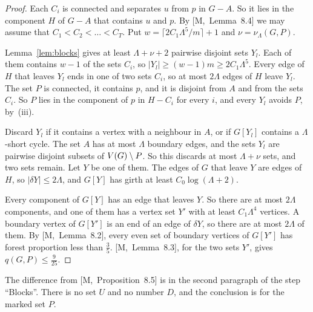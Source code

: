 \documentclass[11pt]{article}
\newcommand{\M}[1]{[M,~#1]}
\begin{document}
\begin{proof}
Each $C_i$ is connected and separates $u$ from $p$ in $G-A$. So it lies in the component $H$ of
$G-A$ that contains $u$ and $p$. By \M{Lemma~8.4} we may assume that $C_1<C_2<\dots<C_T$. Put
$w=\lceil2C_1\Lambda^{5}/m\rceil+1$ and $\nu=\nu_\Lambda(G,P)$.

 Lemma~\ref{lem:blocks} gives at least $\Lambda+\nu+2$ pairwise disjoint sets
$Y_l$. Each of them contains $w-1$ of the sets $C_i$, so $|Y_l|\ge(w-1)m\ge2C_1\Lambda^{5}$. Every
edge of $H$ that leaves $Y_l$ ends in one of two sets $C_i$, so at most $2\Lambda$ edges of $H$
leave $Y_l$. The set $P$ is connected, it contains $p$, and it is disjoint from $A$ and from the
sets $C_i$. So $P$ lies in the component of $p$ in $H-C_i$ for every $i$, and every $Y_l$ avoids
$P$, by~(iii).

Discard $Y_l$ if it contains a vertex with a neighbour in $A$, or if $G[Y_l]$ contains a
$\Lambda$-short cycle. The set $A$ has at most $\Lambda$ boundary edges, and the sets $Y_l$ are
pairwise disjoint subsets of $V(G)\setminus P$. So this discards at most $\Lambda+\nu$ sets, and two
sets remain. Let $Y$ be one of them. The edges of $G$ that leave $Y$ are edges of $H$, so
$|\delta Y|\le2\Lambda$, and $G[Y]$ has girth at least $C_0\log(\Lambda+2)$.

 Every component of $G[Y]$ has an edge that leaves $Y$. So there are at most
$2\Lambda$ components, and one of them has a vertex set $Y'$ with at least $C_1\Lambda^{4}$
vertices. A boundary vertex of $G[Y']$ is an end of an edge of $\delta Y$, so there are at most
$2\Lambda$ of them. By \M{Lemma~8.2}, every even set of boundary vertices of $G[Y']$ has forest
proportion less than $\frac35$. \M{Lemma~8.3}, for the two sets $Y'$, gives
$q(G,P)\le\frac9{25}$.
\end{proof}

The difference from \M{Proposition~8.5} is in the second paragraph of the step ``Blocks''. There
is no set $U$ and no number $D$, and the conclusion is for the marked set $P$.
\end{document}
